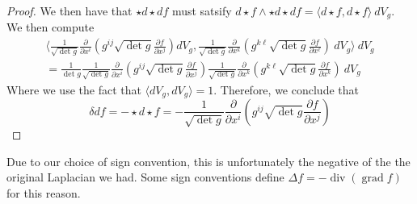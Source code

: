 \documentclass[psamsfonts]{amsart}
\theoremstyle{definition}
\theoremstyle{remark}
\DeclareMathOperator{\dv}{div}
\DeclareMathOperator{\grad}{grad}
\begin{document}
\begin{proof}
We then have that $\star d\star df$ must satsify $d\star f \wedge \star d\star df = \langle d\star f, d\star f \rangle~dV_g$. We then compute
\begin{align*}
\biggl\langle \frac{1}{\sqrt{\det g}} \frac{\partial}{\partial x^i}\left( g^{ij}\sqrt{\det g}\frac{\partial f}{\partial x^j} \right) dV_g, \frac{1}{\sqrt{\det g}} \frac{\partial}{\partial x^k}\left( g^{k\ell}\sqrt{\det g}\frac{\partial f}{\partial x^\ell} \right)~dV_g\biggr\rangle~dV_g  \\
= \frac{1}{\det g}\frac{1}{\sqrt{\det g}} \frac{\partial}{\partial x^i}\left( g^{ij}\sqrt{\det g}\frac{\partial f}{\partial x^j} \right)    \frac{1}{\sqrt{\det g}} \frac{\partial}{\partial x^k}\left( g^{k\ell}\sqrt{\det g}\frac{\partial f}{\partial x^k} \right) ~dV_g
\end{align*}
Where we use the fact that $\langle dV_g, dV_g \rangle = 1$. Therefore, we conclude that 
$$\delta df = -\star d\star f = -\frac{1}{\sqrt{\det g}} \frac{\partial}{\partial x^i}\left( g^{ij}\sqrt{\det g}\frac{\partial f}{\partial x^j} \right) $$
\end{proof}
Due to our choice of sign convention, this is unfortunately the negative of the the original Laplacian we had. Some sign conventions define $\Delta f = -\dv(\grad f)$ for this reason.\\
\end{document}

